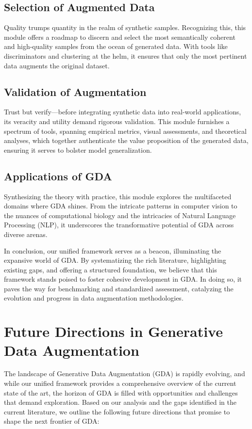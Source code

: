 \documentclass[preprint,12pt,authoryear]{elsarticle}
\begin{document}
\subsection{Selection of Augmented Data}
Quality trumps quantity in the realm of synthetic samples. Recognizing this, this module offers a roadmap to discern and select the most semantically coherent and high-quality samples from the ocean of generated data. With tools like discriminators and clustering at the helm, it ensures that only the most pertinent data augments the original dataset.

\subsection{Validation of Augmentation}
Trust but verify—before integrating synthetic data into real-world applications, its veracity and utility demand rigorous validation. This module furnishes a spectrum of tools, spanning empirical metrics, visual assessments, and theoretical analyses, which together authenticate the value proposition of the generated data, ensuring it serves to bolster model generalization.

\subsection{Applications of GDA}
Synthesizing the theory with practice, this module explores the multifaceted domains where GDA shines. From the intricate patterns in computer vision to the nuances of computational biology and the intricacies of Natural Language Processing (NLP), it underscores the transformative potential of GDA across diverse arenas.

In conclusion, our unified framework serves as a beacon, illuminating the expansive world of GDA. By systematizing the rich literature, highlighting existing gaps, and offering a structured foundation, we believe that this framework stands poised to foster cohesive development in GDA. In doing so, it paves the way for benchmarking and standardized assessment, catalyzing the evolution and progress in data augmentation methodologies.

\section{Future Directions in Generative Data Augmentation}

The landscape of Generative Data Augmentation (GDA) is rapidly evolving, and while our unified framework provides a comprehensive overview of the current state of the art, the horizon of GDA is filled with opportunities and challenges that demand exploration. Based on our analysis and the gaps identified in the current literature, we outline the following future directions that promise to shape the next frontier of GDA:
\end{document}
